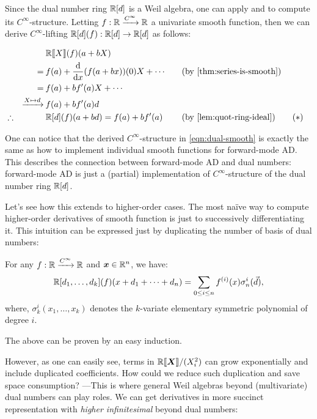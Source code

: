 \documentclass[%
  sigconf,authorversion,screen]{acmart}
\begin{document}
Since the dual number ring $\mathbb{R}[d]$ is a Weil algebra, one can apply  and  to compute its $C^\infty$-structure.
Letting $f: \mathbb{R} \xrightarrow{C^\infty} \mathbb{R}$ a univariate smooth function, then we can derive $C^\infty$-lifting $\mathbb{R}[d](f): \mathbb{R}[d] \to \mathbb{R}[d]$ as follows:

\begin{alignat*}{3}
  &&&\R\llbracket{}X\rrbracket(f)(a + bX) \\
  &&=\:&f(a) + \frac{\mathrm d}{\mathrm{d} x}(f(a + bx))(0) X + \cdots
  &\quad&(\text{by \Cref{thm:series-is-smooth}})\\
  &&=\:&f(a) + b f'(a) X + \cdots\\
  &&\xrightarrow{X \mapsto d}\:&f(a) + bf'(a) d\\
  &\therefore&& \R[d](f)(a + bd) = f(a) + b f'(a) 
  && (\text{by \Cref{lem:quot-ring-ideal}}) \tag{\ensuremath{\ast}}
  \label{eqn:dual-smooth}
\end{alignat*}

One can notice that the derived $C^\infty$-structure in \eqref{eqn:dual-smooth} is exactly the same as how to implement individual smooth functions for forward-mode AD.
This describes the connection between forward-mode AD and dual numbers: forward-mode AD is just a (partial) implementation of $C^\infty$-structure of the dual number ring $\mathbb{R}[d]$.

Let's see how this extends to higher-order cases.
The most naïve way to compute higher-order derivatives of smooth function is just to successively differentiating it.
This intuition can be expressed just by duplicating the number of basis of dual numbers:
\begin{theorem}\label{thm:univ-partial-duals}
  For any $f: \mathbb{R} \xrightarrow{C^\infty} \mathbb{R}$ and $\boldsymbol{x} \in \mathbb{R}^n$, we have:
  \[
    \mathbb{R}[d_1, \dots, d_k](f)(x + d_1 + \cdots + d_n) 
    = \sum_{0 \leq i \leq n} f^{(i)}(x)\sigma^i_n(\vec{d}),
  \]
  where, $\sigma^i_k(x_1, \dots, x_k)$ denotes the $k$-variate elementary symmetric polynomial of degree $i$.
\end{theorem}

The above can be proven by an easy induction.

However, as one can easily see, terms in $\mathord{\mathbb{R}\llbracket\boldsymbol{X}\rrbracket}/(X_i^2)$ can grow exponentially and include duplicated coefficients.
How could we reduce such duplication and save space consumption? ---This is where general Weil algebras beyond (multivariate) dual numbers can play roles.
We can get derivatives in more succinct representation with \emph{higher infinitesimal} beyond dual numbers:
\end{document}

